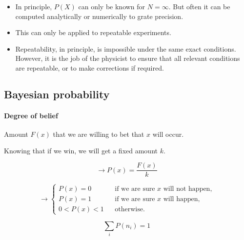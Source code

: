 \begin{itemize}
    \item In principle, $P(X)$ can only be known for $N=\infty$. But often it can be computed analytically or numerically to grate precision. 
    \item This can only be applied to repeatable experiments. 
    
    
    \item Repeatability, in principle, is impossible under the same exact conditions. However, it is the job of the physicist to ensure that all relevant conditions are repeatable, or to make corrections if required. 
\end{itemize}


\subsection{Bayesian probability}
\label{subsec:bayesian_prob}

\paragraph{Degree of belief}

Amount $F(x)$ that we are willing to bet that $x$ will occur.

Knowing that if we win, we will get a fixed amount $k$.

\begin{equation}
	\to P(x) = \frac{F(x)}{k}
\end{equation}

\begin{equation}
	\to \left\{
	\begin{array}{rcl}
		P(x) = 0 & & {\textrm{if we are sure } x \textrm{ will not happen,}}\\
		P(x) = 1 & & {\textrm{if we are sure } x \textrm{ will happen,}}\\
		0 < P(x) < 1 & & {\textrm{otherwise.}}
	\end{array} \right.
\end{equation}

\begin{equation}\label{eq:norm_cond}
	\sum_{i} P(n_{i}) = 1
\end{equation}

